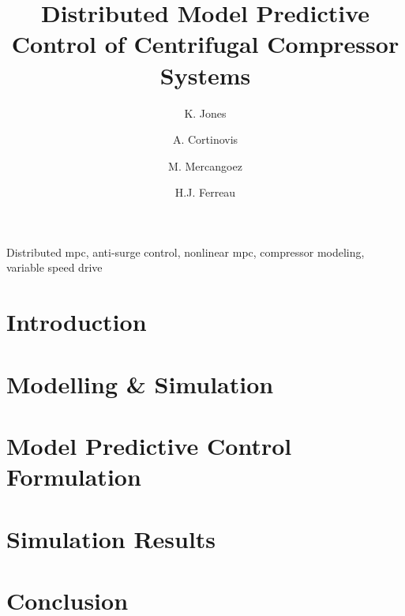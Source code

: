 \documentclass{ifacconf}
\newcommand{\mysec}[1]{%
  \vspace{-0.3ex}
  \section{#1}
  \vspace{-1.2ex}
}
\begin{document}
\begin{frontmatter}

\title{Distributed Model Predictive Control of Centrifugal Compressor Systems} 


\author[First]{K. Jones} 
\author[First]{A. Cortinovis} 
\author[First]{M. Mercangoez}
\author[First]{H.J. Ferreau}

\address[First]{ABB Switzerland Ltd., Corporate Research, Baden-Dättwil, Switzerland (e-mail: katie.jones@reactive-robotics.com, andrea.cortinovis@ch.abb.com, mehmet.mercangoez@ch.abb.com, joachim.ferreau@ch.abb.com).}

\begin{abstract}                %
  
\end{abstract}

\begin{keyword}
  Distributed mpc, anti-surge control, nonlinear mpc, compressor modeling, variable speed drive
\end{keyword}

\end{frontmatter}

\mysec{Introduction}


\mysec{Modelling \& Simulation}


\mysec{Model Predictive Control Formulation}


\mysec{Simulation Results}


\mysec{Conclusion}

\vspace{-0.1cm}
\vskip 0pt

\end{document}
